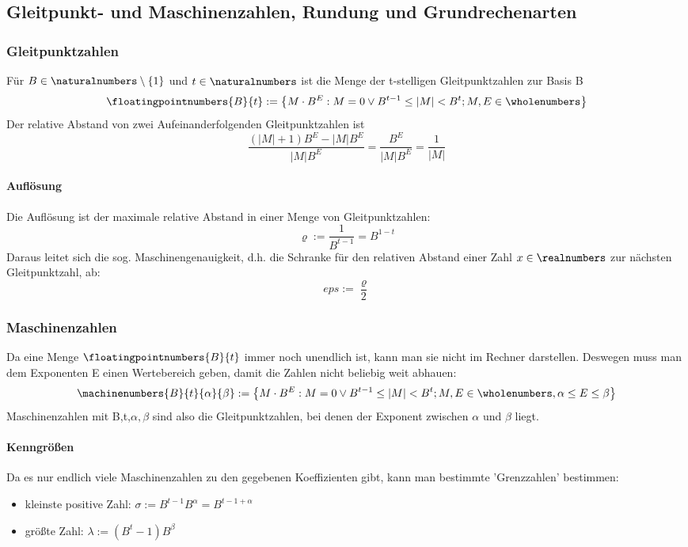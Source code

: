 	\subsection{Gleitpunkt- und Maschinenzahlen, Rundung und Grundrechenarten}
		
			\subsubsection{Gleitpunktzahlen}
				Für $ B \in \naturalnumbers \setminus \{1\} $ und $ t \in \naturalnumbers $ ist die Menge der t-stelligen Gleitpunktzahlen zur Basis B
				$$ \floatingpointnumbers{B}{t} := \big\{M\cdot B^E: M = 0 \vee B^{t-1} \leq |M| < B^t; M,E \in \wholenumbers \big\} $$
				Der relative Abstand von zwei Aufeinanderfolgenden Gleitpunktzahlen ist
				$$ \frac{(|M|+1)B^E - |M|B^E}{|M|B^E} = \frac{B^E}{|M|B^E} = \frac{1}{|M|} $$
				
				\paragraph{Auflösung} Die Auflösung ist der maximale relative Abstand in einer Menge von Gleitpunktzahlen: 
				$$ \varrho := \frac{1}{B^{t-1}} = B^{1-t} $$
				Daraus leitet sich die sog. Maschinengenauigkeit, d.h. die Schranke für den relativen Abstand einer Zahl $ x\in \realnumbers $ zur nächsten Gleitpunktzahl, ab:
				$$ eps := \frac{\varrho}{2} $$
				
			\subsubsection{Maschinenzahlen}
				Da eine Menge $ \floatingpointnumbers{B}{t} $ immer noch unendlich ist, kann man sie nicht im Rechner darstellen. Deswegen muss man dem Exponenten E einen Wertebereich geben, damit die Zahlen nicht beliebig weit abhauen:
				$$ \machinenumbers{B}{t}{\alpha}{\beta} := \big\{M\cdot B^E: M = 0 \vee B^{t-1} \leq |M| < B^t; M,E \in \wholenumbers, \alpha \leq E \leq \beta \big\} $$
				Maschinenzahlen mit B,t,$ \alpha,\beta $ sind also die Gleitpunktzahlen, bei denen der Exponent zwischen $ \alpha $ und $ \beta $ liegt.
				
				\paragraph{Kenngrößen} Da es nur endlich viele Maschinenzahlen zu den gegebenen Koeffizienten gibt, kann man bestimmte 'Grenzzahlen' bestimmen:
				\begin{itemize}
					\item kleinste positive Zahl: $ \sigma := B^{t-1}B^{\alpha} = B^{t-1+\alpha}$
					\item größte Zahl: $ \lambda := (B^{t} - 1)B^{\beta} $\Biglb
				\end{itemize} 
			
